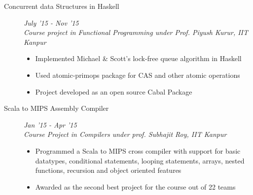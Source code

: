 \documentclass[9pt]{article}
\newenvironment{changemargin}[2]{%
  \begin{list}{}{%
    \setlength{\topsep}{0pt}%
    \setlength{\leftmargin}{#1}%
    \setlength{\rightmargin}{#2}%
    \setlength{\listparindent}{\parindent}%
    \setlength{\itemindent}{\parindent}%
    \setlength{\parsep}{\parskip}%
  }%
  \item[]}{\end{list}
}
\newenvironment{body} {
	\vspace*{-16pt}
	\begin{changemargin}{-0.6in}{-0.65in}
  }	
	{\end{changemargin}
}
\begin{document}
\begin{body}
\begin{description}
	  \item[\normalsize{Concurrent data Structures in Haskell}] \hfill  \textit{July '15 - Nov '15} \\
	  \textit{Course project in Functional Programming under Prof. Piyush Kurur, IIT Kanpur}
	  \begin{itemize}
	   \item Implemented Michael \& Scott's lock-free queue algorithm in Haskell
	   \item Used atomic-primops package for CAS and other atomic operations
	   \item Project developed as an open source Cabal Package
	  \end{itemize}
	

 	\item[\normalsize{Scala to MIPS Assembly Compiler}] \hfill \textit{Jan '15 - Apr '15} \\
 	\textit{Course Project in Compilers under prof. Subhajit Roy, IIT Kanpur}
 	\begin{itemize}
 	 \item Programmed a Scala to MIPS cross compiler with support for basic datatypes, conditional statements,
 looping statements, arrays, nested functions, recursion and object oriented features
 	 \item Awarded as the second best project for the course out of 22 teams
 	\end{itemize}
 	

\end{description}
\end{body}
\end{document}
